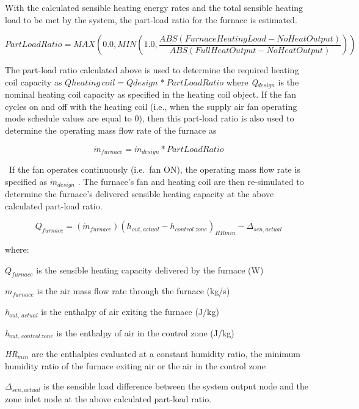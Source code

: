 With the calculated sensible heating energy rates and the total sensible heating load to be met by the system, the part-load ratio for the furnace is estimated.

\begin{equation}
PartLoadRatio = MAX\left( {0.0,MIN\left( {1.0,\frac{{ABS\left( {FurnaceHeatingLoad - NoHeatOutput} \right)}}{{ABS(FullHeatOutput - NoHeatOutput)}}} \right)} \right)
\end{equation}

The part-load ratio calculated above is used to determine the required heating coil capacity as \(Qheating\,coil = Qdesign\,*PartLoadRatio\) where \emph{Q\(_{design}\)} is the nominal heating coil capacity as specified in the heating coil object. If the fan cycles on and off with the heating coil (i.e., when the supply air fan operating mode schedule values are equal to 0), then this part-load ratio is also used to determine the operating mass flow rate of the furnace as

\begin{equation}
{\dot m_{furnace}} = {\dot m_{design}}*PartLoadRatio
\end{equation}

~If the fan operates continuously (i.e.~fan ON), the operating mass flow rate is specified as \({\dot m_{design}}\) . The furnace's fan and heating coil are then re-simulated to determine the furnace's delivered sensible heating capacity at the above calculated part-load ratio.

\begin{equation}
{Q_{furnace}} = \left( {{{\dot m}_{furnace}}} \right){\left( {{h_{out,actual}} - {h_{control~zone}}} \right)_{HRmin}} - {\Delta_{sen,actual}}
\end{equation}

where:

\({Q_{furnace}}\) is the sensible heating capacity delivered by the furnace (W)

\({\dot m_{furnace}}\) is the air mass flow rate through the furnace (kg/s)

\emph{h\(_{out,\, actual}\)} is the enthalpy of air exiting the furnace (J/kg)

\emph{h\(_{out,\, control\, zone}\)} is the enthalpy of air in the control zone (J/kg)

\emph{HR\(_{min}\)} are the enthalpies evaluated at a constant humidity ratio, the minimum humidity ratio of the furnace exiting air or the air in the control zone

\(\Delta_{sen,actual}\) is the sensible load difference between the system output node and the zone inlet node at the above calculated part-load ratio.

